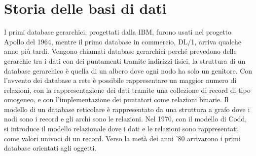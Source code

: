\section{Storia delle basi di dati}
I primi database gerarchici, progettati dalla IBM, furono usati nel progetto Apollo del 1964, mentre il primo database in commercio, DL/1, arriva qualche anno più tardi. Vengono chiamati database gerarchici perché prevedono delle gerarchie tra i dati con dei puntamenti tramite indirizzi fisici, la struttura di un database gerarchico è quella di un albero dove ogni nodo ha solo un genitore. Con l'avvento dei database a rete è possibile rappresentare un maggior numero di relazioni, con la rappresentazione dei dati tramite una collezione di record di tipo omogeneo, e con l'implementazione dei puntatori come relazioni binarie. Il modello di un database reticolare è rappresentato da una struttura a grafo dove i nodi sono i record e gli archi sono le relazioni. Nel 1970, con il modello di Codd, si introduce il modello relazionale dove i dati e le relazioni sono rappresentati come valori univoci di un record.
Verso la metà dei anni '80 arrivarono i primi database orientati agli oggetti.

